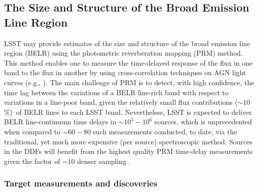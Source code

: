 %
%
%

\subsection{The Size and Structure of the Broad Emission Line Region}
\def\secname{\chpname:photoRM}\label{sec:\secname}


LSST may provide estimates of the size and structure of the broad
emission line region (BELR) using the photometric reverberation
mapping (PRM) method. This method enables one to measure the
time-delayed response of the flux in one band to the flux
in another by using cross-correlation techniques on AGN light
curves (e.g.,
\citealt{CheloucheEtal2014}).
The main challenge of PRM is to detect,
with high confidence, the time lag between the variations of a BELR
line-rich band with respect to variations in a line-poor band, given
the relatively small flux contributions ($\sim10$\%)~of BELR lines to each
LSST band. Nevertheless, LSST is expected to deliver BELR line-continuum
time delays in $\sim10^5-10^6$ sources, which is unprecedented when
compared to $\sim60-80$ such measurements conducted, to date, via the
traditional, yet much more expensive (per source) spectroscopic method.
Sources in the DDFs will benefit from the highest
quality PRM time-delay measurements given the factor of $\sim10$ denser
sampling \citep{CheloucheEtal2014}.


\subsubsection{Target measurements and discoveries}
\label{sec:\secname:targets}

